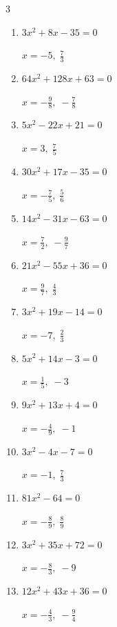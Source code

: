 \begin{multicols}{3}
\begin{enumerate}
  \item $3x^{2}+8x-35=0$

        $\displaystyle x=-5,\; \frac{7}{3}$

\columnbreak %

  \item $64x^{2}+128x+63=0$

        $\displaystyle x=-\frac{9}{8},\; -\frac{7}{8}$

  \item $5x^{2}-22x+21=0$

        $\displaystyle x=3,\; \frac{7}{5}$

  \item $30x^{2}+17x-35=0$

        $\displaystyle x=-\frac{7}{5},\; \frac{5}{6}$

  \item $14x^{2}-31x-63=0$

        $\displaystyle x=\frac{7}{2},\; -\frac{9}{7}$

  \item $21x^{2}-55x+36=0$

        $\displaystyle x=\frac{9}{7},\; \frac{4}{3}$

  \item $3x^{2}+19x-14=0$

        $\displaystyle x=-7,\; \frac{2}{3}$

  \item $5x^{2}+14x-3=0$

        $\displaystyle x=\frac{1}{5},\; -3$

  \item $9x^{2}+13x+4=0$

        $\displaystyle x=-\frac{4}{9},\; -1$

  \item $3x^{2}-4x-7=0$

        $\displaystyle x=-1,\; \frac{7}{3}$

  \item $81x^{2}-64=0$

        $\displaystyle x=-\frac{8}{9},\; \frac{8}{9}$

\columnbreak %

  \item $3x^{2}+35x+72=0$

        $\displaystyle x=-\frac{8}{3},\; -9$

  \item $12x^{2}+43x+36=0$

        $\displaystyle x=-\frac{4}{3},\; -\frac{9}{4}$


\end{enumerate}
\end{multicols}
